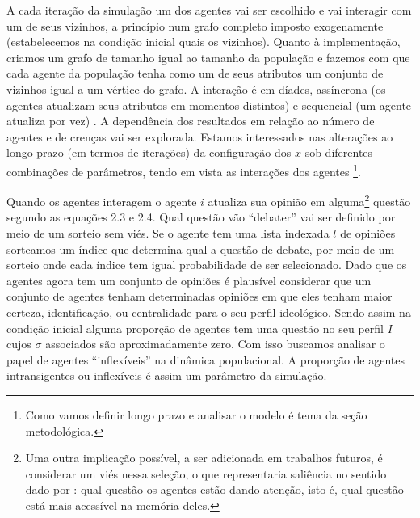 A cada iteração da simulação um dos agentes vai ser escolhido e vai interagir
com um de seus vizinhos, a princípio num grafo completo imposto exogenamente
(estabelecemos na condição inicial quais os vizinhos). Quanto à implementação,
criamos um grafo de tamanho igual ao tamanho da população e fazemos com que cada
agente da população tenha como um de seus atributos um conjunto de vizinhos
igual a um vértice do grafo. A interação é em díades, assíncrona (os
agentes atualizam seus atributos em momentos distintos) e sequencial (um agente
atualiza por vez) \cite{wilensky2015introduction}. A dependência dos resultados
em relação ao número de agentes e de crenças vai ser explorada. Estamos
interessados nas alterações ao longo prazo (em termos de iterações) da
configuração dos \(x\) sob diferentes combinações de parâmetros, tendo em vista
as interações dos agentes \cite{acemoglu2011opinion} \footnote{Como vamos
  definir longo prazo e analisar o modelo é tema da seção metodológica.}.

Quando os agentes interagem o agente \(i\) atualiza sua opinião em alguma\footnote{ Uma
  outra implicação possível, a ser adicionada em trabalhos futuros, é considerar
  um viés nessa seleção, o que representaria saliência no sentido dado por
  : qual questão os agentes estão dando atenção,
  isto é, qual questão está mais acessível na memória deles.} questão segundo as
equações 2.3 e 2.4. Qual questão vão ``debater'' vai ser definido por meio de um
sorteio sem viés. Se o agente tem uma lista indexada \(l\) de opiniões sorteamos
um índice que determina qual a questão de debate, por meio de um sorteio onde
cada índice tem igual probabilidade de ser selecionado. Dado que os agentes
agora tem um conjunto de opiniões é plausível considerar que um conjunto de
agentes tenham determinadas opiniões em que eles tenham maior certeza,
identificação, ou centralidade para o seu perfil ideológico. Sendo assim na
condição inicial alguma proporção de agentes tem uma questão no seu perfil \(I\)
cujos \(\sigma\) associados são aproximadamente zero. Com isso buscamos analisar o
papel de agentes ``inflexíveis'' na dinâmica populacional. A proporção de
agentes intransigentes ou inflexíveis é assim um parâmetro da simulação.

